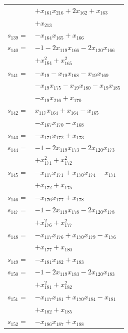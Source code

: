 \begin{longtable}{@{}r@{\;}l@{}}
 & \(\displaystyle +x_{161}x_{216} +2x_{162} +x_{163}\) \\
 & \(\displaystyle +x_{213}\) \\[3pt]
\(s_{139}=\) & \(\displaystyle -x_{164}x_{165} +x_{166}\) \\[3pt]
\(s_{140}=\) & \(\displaystyle -1 -2x_{119}x_{166} -2x_{120}x_{166}\) \\
 & \(\displaystyle +x_{164}^{2} +x_{165}^{2}\) \\[3pt]
\(s_{141}=\) & \(\displaystyle -x_{19} -x_{19}x_{168} -x_{19}x_{169}\) \\
 & \(\displaystyle -x_{19}x_{175} -x_{19}x_{180} -x_{19}x_{185}\) \\
 & \(\displaystyle -x_{19}x_{216} +x_{170}\) \\[3pt]
\(s_{142}=\) & \(\displaystyle x_{117}x_{164} +x_{164} -x_{165}\) \\
 & \(\displaystyle -x_{167}x_{170} -x_{168}\) \\[3pt]
\(s_{143}=\) & \(\displaystyle -x_{171}x_{172} +x_{173}\) \\[3pt]
\(s_{144}=\) & \(\displaystyle -1 -2x_{119}x_{173} -2x_{120}x_{173}\) \\
 & \(\displaystyle +x_{171}^{2} +x_{172}^{2}\) \\[3pt]
\(s_{145}=\) & \(\displaystyle -x_{117}x_{171} +x_{170}x_{174} -x_{171}\) \\
 & \(\displaystyle +x_{172} +x_{175}\) \\[3pt]
\(s_{146}=\) & \(\displaystyle -x_{176}x_{177} +x_{178}\) \\[3pt]
\(s_{147}=\) & \(\displaystyle -1 -2x_{119}x_{178} -2x_{120}x_{178}\) \\
 & \(\displaystyle +x_{176}^{2} +x_{177}^{2}\) \\[3pt]
\(s_{148}=\) & \(\displaystyle -x_{117}x_{176} +x_{170}x_{179} -x_{176}\) \\
 & \(\displaystyle +x_{177} +x_{180}\) \\[3pt]
\(s_{149}=\) & \(\displaystyle -x_{181}x_{182} +x_{183}\) \\[3pt]
\(s_{150}=\) & \(\displaystyle -1 -2x_{119}x_{183} -2x_{120}x_{183}\) \\
 & \(\displaystyle +x_{181}^{2} +x_{182}^{2}\) \\[3pt]
\(s_{151}=\) & \(\displaystyle -x_{117}x_{181} +x_{170}x_{184} -x_{181}\) \\
 & \(\displaystyle +x_{182} +x_{185}\) \\[3pt]
\(s_{152}=\) & \(\displaystyle -x_{186}x_{187} +x_{188}\) \\[3pt]

\end{longtable}
